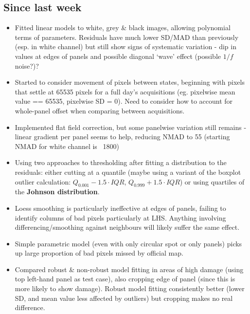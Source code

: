 \documentclass[10pt,fleqn]{article}
\begin{document}
\subsection*{Since last week}

\begin{itemize}

\item Fitted linear models to white, grey \& black images, allowing polynomial terms of parameters. Residuals have much lower SD/MAD than previously (esp. in white channel) but still show signs of systematic variation - dip in values at edges of panels and possible diagonal `wave' effect (possible $1/f$ noise?)?
 
\item Started to consider movement of pixels between states, beginning with pixels that settle at 65535 pixels for a full day's acquisitions (eg. pixelwise mean value == 65535, pixelwise SD = 0). Need to consider how to account for whole-panel offset when comparing between acquisitions.

\item Implemented flat field correction, but some panelwise variation still remains - linear gradient per panel seems to help, reducing NMAD to 55 (starting NMAD for white channel is ~1800)

\item Using two approaches to thresholding after fitting a distribution to the residuals: either cutting at a quantile (maybe using a variant of the boxplot outlier calculation: $Q_{0.001} - 1.5 \cdot IQR$, $Q_{0.999} + 1.5 \cdot IQR$) or using quartiles of the \textbf{Johnson distribution}.

\item Loess smoothing is particularly ineffective at edges of panels, failing to identify columns of bad pixels particularly at LHS. Anything involving differencing/smoothing against neighbours will likely suffer the same effect.

\item Simple parametric model (even with only circular spot or only panels) picks up large proportion of bad pixels missed by official map.

\item Compared robust \& non-robust model fitting in areas of high damage (using top left-hand panel as test case), also cropping edge of panel (since this is more likely to show damage). Robust model fitting consistently better (lower SD, and mean value less affected by outliers) but cropping makes no real difference.


\end{itemize}
\end{document}
